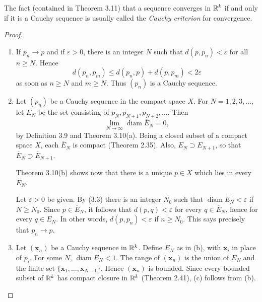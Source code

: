 The fact (contained in Theorem 3.11) that a sequence converges in $\mathbb{R}^k$ if and
only if it is a Cauchy sequence is usually called the \emph{Cauchy criterion}
for convergence.

\begin{proof}
\begin{enumerate}[label=(\alph*), leftmargin=2.2em, itemsep=4pt, topsep=3pt]
  \item If $p_n \to p$ and if $\varepsilon > 0$, there is an integer $N$ such
        that $d(p,p_n) < \varepsilon$ for all $n \ge N$. Hence
        \[ d(p_n,p_m) \le d(p_n,p) + d(p,p_m) < 2\varepsilon \]
        as soon as $n \ge N$ and $m \ge N$. Thus $(p_n)$ is a Cauchy
        sequence.
  \item Let $(p_n)$ be a Cauchy sequence in the compact space $X$. For
        $N = 1,2,3,\dots$, let $E_N$ be the set consisting of
        $p_N, p_{N+1}, p_{N+2}, \dots$. Then
        \begin{equation}
          \lim_{N\to\infty} \operatorname{diam} \overline{E}_N = 0, \tag{3.3}
        \end{equation}
        by Definition 3.9 and Theorem 3.10(a). Being a closed subset of a
        compact space $X$, each $\overline{E}_N$ is compact (Theorem 2.35).
        Also, $E_N \supset E_{N+1}$, so that
        $\overline{E}_N \supset \overline{E}_{N+1}$.

        Theorem 3.10(b) shows now that there is a unique $p \in X$ which lies
        in every $\overline{E}_N$.

        Let $\varepsilon > 0$ be given. By (3.3) there is an integer $N_0$
        such that $\operatorname{diam} \overline{E}_N < \varepsilon$ if
        $N \ge N_0$. Since $p \in \overline{E}_N$, it follows that
        $d(p,q) < \varepsilon$ for every $q \in \overline{E}_N$, hence for
        every $q \in E_N$. In other words, $d(p,p_n) < \varepsilon$ if
        $n \ge N_0$. This says precisely that $p_n \to p$.
  \item Let $(\mathbf{x}_n)$ be a Cauchy sequence in $\mathbb{R}^k$. Define $E_N$ as
        in (b), with $\mathbf{x}_i$ in place of $p_i$. For some $N$,
        $\operatorname{diam} E_N < 1$. The range of $(\mathbf{x}_n)$ is the
        union of $E_N$ and the finite set
        $\{\mathbf{x}_1,\dots,\mathbf{x}_{N-1}\}$. Hence $(\mathbf{x}_n)$ is
        bounded. Since every bounded subset of $\mathbb{R}^k$ has compact closure in
        $\mathbb{R}^k$ (Theorem 2.41), (c) follows from (b).
\end{enumerate}
\end{proof}

